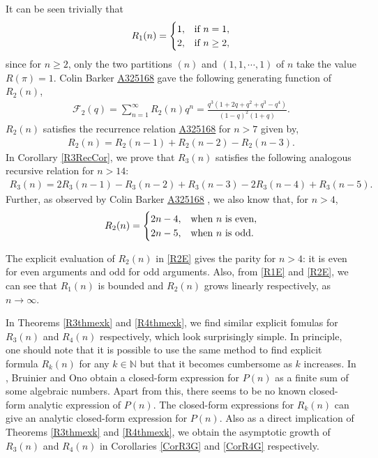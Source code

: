 \documentclass[12pt,reqno]{amsart}
\numberwithin{equation}{section}
\theoremstyle{plain}
\newcommand{\seqnum}[1]{\href{https://oeis.org/#1}{\rm \underline{#1}}}
\begin{document}
	It can be seen trivially that
	\begin{align}\label{R1E}
		R_1(n) =
		\begin{cases}
			1, & \textup{if } n=1, \\
			2, & \textup{if } n\geq 2,
		\end{cases}
	\end{align} 
	since for $n \geq 2$, only the two partitions $(n)$ and $(1,1, \cdots, 1)$ of $n$ take the value $R(\pi)=1$. 
	Colin Barker  \seqnum{A325168} \cite{oeis} gave the following generating function of $R_2(n)$,
	\begin{align}
		\mathscr{F}_2(q) = \sum_{n=1}^{\infty} R_2(n) q^n = \frac{q^3 (1+2q+q^2+q^3-q^4)}{(1-q)^2(1+q)}. \label{ScrF2GF}
	\end{align}
	$R_2(n)$ satisfies the recurrence relation  \seqnum{A325168} \cite{oeis} for $n>7$ given by,
	\begin{align}
		R_2(n)=R_2(n-1)+R_2(n-2)-R_2(n-3).  \label{R2Rec}
	\end{align}
	In Corollary \ref{R3RecCor}, we prove that $R_3(n)$ satisfies the following analogous recursive relation for $n>14$:
	\begin{align}
		R_3(n) = 2R_3(n-1) -R_3(n-2) +R_3(n-3) -2R_3(n-4) +R_3(n-5). \label{R3RecInt}
	\end{align}
	Further, as observed by Colin Barker \seqnum{A325168} \cite{oeis}, we also know that, for $n>4$,
	\begin{align}\label{R2E}
		R_2(n) =
		\begin{cases}
			2n-4, & \textup{when $n$ is even}, \\
			2n-5, & \textup{when $n$ is odd}.
		\end{cases}
	\end{align}
	
	
	The explicit evaluation of $R_2(n)$ in \eqref{R2E} gives the parity for $n>4$: it is even for even arguments and odd for odd arguments. Also, from \eqref{R1E} and \eqref{R2E}, we can see that $R_1(n)$ is bounded and $R_2(n)$ grows linearly respectively, as $n \to \infty$.
	
	In Theorems \ref{R3thmexk} and \ref{R4thmexk}, we find similar explicit fomulas for $R_3(n)$ and $R_4(n)$ respectively, which look surprisingly simple. In principle, one should note that it is possible to use the same method to find explicit formula $R_k(n)$ for any $k \in \mathbb{N}$ but that it becomes cumbersome as $k$ increases. In \cite[Theorem 1.1]{ono}, Bruinier and Ono obtain a closed-form expression for $P(n)$ as a finite sum of some algebraic numbers. Apart from this, there seems to be no known closed-form analytic expression of $P(n)$. The closed-form expressions for $R_k(n)$ can give an analytic closed-form expression for $P(n)$. Also as a direct implication of Theorems \ref{R3thmexk} and \ref{R4thmexk}, we obtain the asymptotic growth of $R_3(n)$ and $R_4(n)$ in Corollaries \ref{CorR3G} and \ref{CorR4G} respectively.
\end{document}
